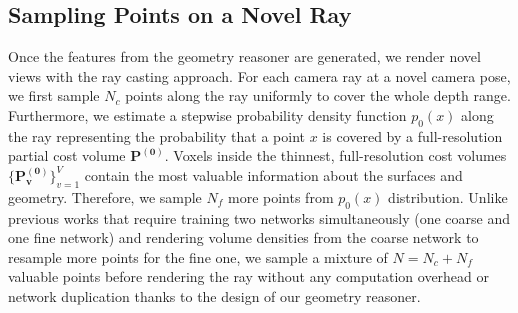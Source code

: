 \subsection{Sampling Points on a Novel Ray} \label{sec:c3_sampling}

Once the features from the geometry reasoner are generated, we render novel views with the ray casting approach. For each camera ray at a novel camera pose, we first sample $N_{c}$ points along the ray uniformly to cover the whole depth range. Furthermore, we estimate a stepwise probability density function $p_{0}(x)$ along the ray representing the probability that a point $x$ is covered by a full-resolution partial cost volume $\boldsymbol{P^{(0)}}$. Voxels inside the thinnest, full-resolution cost volumes $\{\boldsymbol{P_{v}^{(0)}}\}_{v=1}^{V}$ contain the most valuable information about the surfaces and geometry. Therefore, we sample $N_{f}$ more points from $p_{0}(x)$ distribution. Unlike previous works\citep{mildenhall2020nerf,yu2021pixelnerf, wang2021ibrnet, reizenstein2021common, arandjelovic2021nerf} that require training two networks simultaneously (one coarse and one fine network) and rendering volume densities from the coarse network to resample more points for the fine one, we sample a mixture of $N=N_{c} + N_{f}$ valuable points before rendering the ray without any computation overhead or network duplication thanks to the design of our geometry reasoner.

